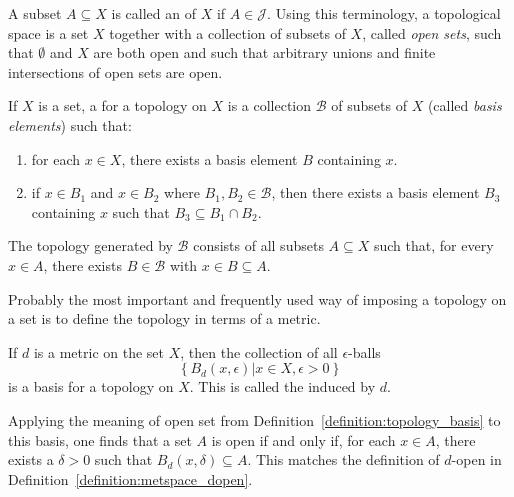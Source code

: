 A subset $A \subseteq X$ is called an  of $X$ if $A \in \mathcal{J}$.
Using this terminology, a topological space is a set $X$ together with a collection of subsets of $X$, called \emph{open sets}, such that $\emptyset$ and $X$ are both open and such that arbitrary unions and finite intersections of open sets are open.

\begin{definition}
\label{definition:topology_basis}
If $X$ is a set, a  for a topology on $X$ is a collection $\mathcal{B}$ of subsets of $X$ (called \emph{basis elements}) such that:
\begin{enumerate}
\item for each $x \in X$, there exists a basis element $B$ containing $x$.
\item if $x \in B_1$ and $x \in B_2$ where $B_1, B_2 \in \mathcal{B}$, then there exists a basis element $B_3$ containing $x$ such that $B_3 \subseteq B_1 \cap B_2$.
\end{enumerate}
The topology generated by $\mathcal B$ consists of all subsets $A\subseteq X$ such that, for every $x\in A$, there exists $B\in\mathcal B$ with $x\in B\subseteq A$.
\end{definition}


Probably the most important and frequently used way of imposing a topology on a set is to define the topology in terms of a metric.
\begin{example}
If $d$ is a metric on the set $X$, then the collection of all $\epsilon$-balls
\begin{equation*}
\left\{ B_d (x, \epsilon) |  x \in X, \epsilon > 0 \right\}
\end{equation*}
is a basis for a topology on $X$.
This is called the  induced by $d$.

Applying the meaning of open set from Definition~\ref{definition:topology_basis} to this basis, one finds that a set $A$ is open if and only if, for each $x \in A$, there exists a $\delta > 0$ such that $B_d(x,\delta)\subseteq A$.
This matches the definition of $d$-open  in Definition~\ref{definition:metspace_dopen}.
\end{example}

